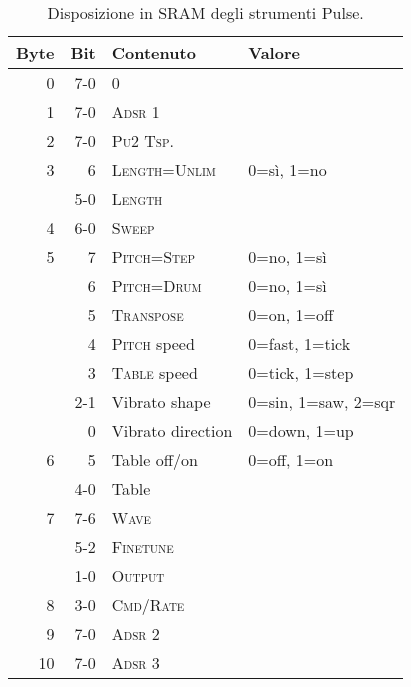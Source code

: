 \begin{table}
	\begin{center}
	\caption{Disposizione in SRAM degli strumenti Pulse.}
	\label{tab:sram-pulse}
	\begin{tabular}{r|r|l|l}
		\toprule
    Byte & Bit & Contenuto & Valore \\
    \midrule
    0  & 7-0 & 0 & \\
    1  & 7-0 & \textsc{Adsr 1} 		& \\
    2  & 7-0 & \textsc{Pu2 Tsp.} 	& \\
    3  & 6   & \textsc{Length=Unlim} 	& 0=sì, 1=no \\
       & 5-0 & \textsc{Length} 		& \\
    4  & 6-0 & \textsc{Sweep} 		& \\
    5  & 7   & \textsc{Pitch=Step} 	& 0=no, 1=sì \\
       & 6   & \textsc{Pitch=Drum} 	& 0=no, 1=sì \\
       & 5   & \textsc{Transpose} 	& 0=on, 1=off \\
       & 4   & \textsc{Pitch} speed	& 0=fast, 1=tick \\
       & 3   & \textsc{Table} speed	& 0=tick, 1=step \\
       & 2-1 & Vibrato shape		& 0=sin, 1=saw, 2=sqr \\
       & 0   & Vibrato direction	& 0=down, 1=up \\
    6  & 5   & Table off/on		& 0=off, 1=on \\
       & 4-0 & Table			& \\
    7  & 7-6 & \textsc{Wave}		& \\
       & 5-2 & \textsc{Finetune}	& \\
       & 1-0 & \textsc{Output}		& \\
    8  & 3-0 & \textsc{Cmd/Rate}	& \\
    9  & 7-0 & \textsc{Adsr 2}		& \\
    10 & 7-0 & \textsc{Adsr 3}		& \\
    \bottomrule
	\end{tabular}
	\end{center}
\end{table}

